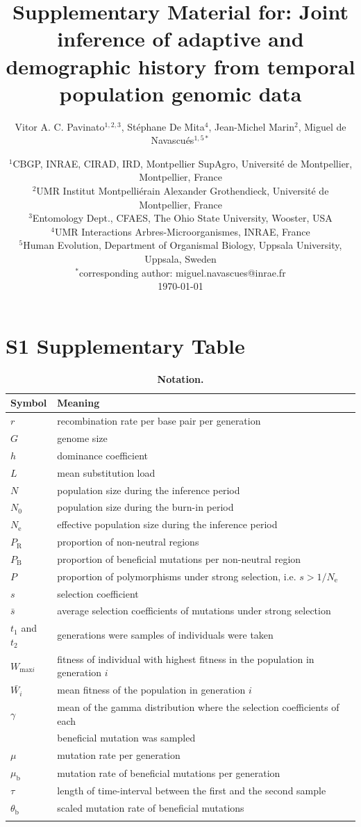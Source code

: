 \documentclass[a4paper, 12pt]{article}
\title{Supplementary Material for: Joint inference of adaptive and demographic history from temporal population genomic data}
\author{\small
            Vitor A. C. Pavinato$^{1,2,3}$, Stéphane De Mita$^4$, Jean-Michel Marin$^2$, Miguel de Navascués$^{1,5*}$}
\date{{\footnotesize %
    $^1$CBGP, INRAE, CIRAD, IRD, Montpellier SupAgro, Université de Montpellier, Montpellier, France\\%
    $^2$UMR Institut Montpelliérain Alexander Grothendieck, Université de Montpellier, France\\%
    $^3$Entomology Dept., CFAES, The Ohio State University, Wooster, USA\\%
    $^4$UMR Interactions Arbres-Microorganismes, INRAE, France \\%
    $^5$Human Evolution, Department of Organismal Biology, Uppsala University, Uppsala, Sweden\\%
    $^*$corresponding author: miguel.navascues@inrae.fr\\[2ex]%
    }
    \footnotesize\today    
}
\begin{document}
\maketitle

\newpage

\section*{S1 Supplementary Table}

\begin{table}[ht]
 \caption{\textbf{Notation.}}
  \centering
  \label{table:tableS1}
  \begin{tabular}{ll}
   \cmidrule(r){1-2}
    Symbol                  & Meaning \\
    \midrule
    $r$        & recombination rate per base pair per generation \\
    $G$                     & genome size\\
    $h$                     & dominance coefficient\\
    $L$                     & mean substitution load\\
    $N$                     & population size during the inference period\\ 
    $N_{\mathrm{0}}$        & population size during the burn-in period\\
    $N_{\mathrm{e}}$        & effective population size during the inference period\\
    $P_{\mathrm{R}}$        & proportion of non-neutral regions\\
    $P_{\mathrm{B}}$        & proportion of beneficial mutations per non-neutral region\\
    $P$                     & proportion of polymorphisms under strong selection, i.e. $s > 1/ N_{\mathrm{e}}$\\
    $s$                     & selection coefficient\\
    $\bar{s}$               & average selection coefficients of mutations under strong selection\\
    $t_1$ and $t_2$         & generations were samples of individuals were taken\\
    $W_{\mathrm{max}i}$     & fitness of individual with highest fitness in the population in generation $i$\\
    $\bar{W_{i}}$           & mean fitness of the population in generation $i$\\
    $\gamma$                & mean of the gamma distribution where the selection coefficients of each\\
                            & beneficial mutation was sampled\\
    $\mu$                   & mutation rate per generation\\
    $\mu_{\mathrm{b}}$      & mutation rate of beneficial mutations per generation\\
    $\tau$                  & length of time-interval between the first and the second sample\\
    $\theta_{\mathrm{b}}$   & scaled mutation rate of beneficial mutations\\
&\\
    

\end{tabular}
\end{table}
\end{document}
